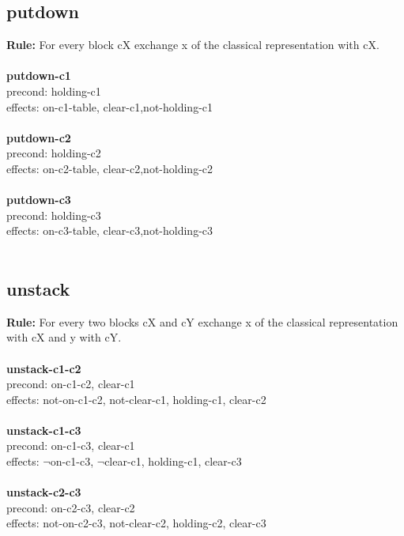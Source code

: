 \documentclass[paper=a4, fontsize=11pt]{scrartcl} %
\numberwithin{equation}{section} %
\numberwithin{figure}{section} %
\numberwithin{table}{section} %
\begin{document}
\subsection{putdown}
\textbf{Rule:} For every block cX exchange x of the classical representation with cX.\\\\

\textbf{putdown-c1}\\
precond: holding-c1\\
effects: on-c1-table, clear-c1,not-holding-c1\\\\

\textbf{putdown-c2}\\
precond: holding-c2\\
effects: on-c2-table, clear-c2,not-holding-c2\\\\

\textbf{putdown-c3}\\
precond: holding-c3\\
effects: on-c3-table, clear-c3,not-holding-c3\\\\

\subsection{unstack}
\textbf{Rule:} For every two blocks cX and cY exchange x of the classical representation with cX and y with cY.\\\\

\textbf{unstack-c1-c2}\\
precond: on-c1-c2, clear-c1\\
effects: not-on-c1-c2, not-clear-c1, holding-c1, clear-c2\\\\

\textbf{unstack-c1-c3}\\
precond: on-c1-c3, clear-c1\\
effects: $\lnot$on-c1-c3, $\lnot$clear-c1, holding-c1, clear-c3\\\\

\textbf{unstack-c2-c3}\\
precond: on-c2-c3, clear-c2\\
effects: not-on-c2-c3, not-clear-c2, holding-c2, clear-c3\\\\
\end{document}
